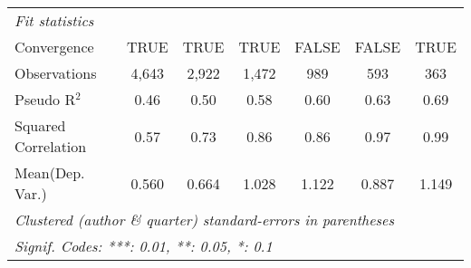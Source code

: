 \begin{tabular}{lcccccc}
   \midrule
   \emph{Fit statistics}\\
   Convergence                                                &TRUE     & TRUE         & TRUE          & FALSE         & FALSE         & TRUE\\  
   Observations                                               & 4,643   & 2,922        & 1,472         & 989           & 593           & 363\\  
   Pseudo R$^2$                                               & 0.46    & 0.50         & 0.58          & 0.60          & 0.63          & 0.69\\  
   Squared Correlation                                        & 0.57    & 0.73         & 0.86          & 0.86          & 0.97          & 0.99\\  
Mean(Dep. Var.) & 0.560 & 0.664 & 1.028 & 1.122 & 0.887 & 1.149 \\
   \midrule \midrule
   \multicolumn{7}{l}{\emph{Clustered (author \& quarter) standard-errors in parentheses}}\\
   \multicolumn{7}{l}{\emph{Signif. Codes: ***: 0.01, **: 0.05, *: 0.1}}\\
\end{tabular}
\par\endgroup
